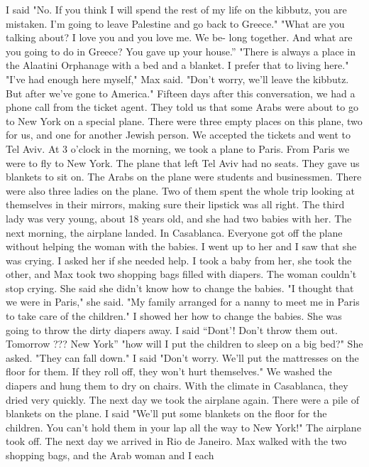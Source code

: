I said "No. If you think I will spend the rest of my life 
on the kibbutz, you are mistaken. I'm going to leave Palestine and go 
back to Greece." 
"What are you talking about? I love you and you love me. We be-
long together. And what are you going to do in Greece? You gave up your house.”
"There is always a place in the Alaatini Orphanage with a bed and 
a blanket. I prefer that to living here." 
"I've had enough here myself," Max said. "Don't worry, we'll leave 
the kibbutz. But after we've gone to America." 
Fifteen days after this conversation, we had a phone call from the 
ticket agent. They told us that some Arabs were about to go to New 
York on a special plane. There were three empty places on this plane, 
two for us, and one for another Jewish person. We accepted the tickets 
and went to Tel Aviv. At 3 o'clock in the morning, we took a plane to 
Paris. From Paris we were to fly to New York. The plane that left Tel 
Aviv had no seats. They gave us blankets to sit on. The Arabs on the 
plane were students and businessmen. There were also three ladies on the 
plane. Two of them spent the whole trip looking at themselves in their 
mirrors, making sure their lipstick was all right. The third lady was 
very young, about 18 years old, and she had two babies with her. 
The next morning, the airplane landed. In Casablanca. Everyone 
got off the plane without helping the woman with the babies. I went 
up to her and I saw that she was crying. I asked her if she needed help. 
I took a baby from her, she took the other, and Max took two shopping 
bags filled with diapers. The woman couldn't stop crying. She said 
she didn't know how to change the babies. 
"I thought that we were in Paris," she said. "My family arranged 
for a nanny to meet me in Paris to take care of the children." 
I showed her how to change the babies. She was going to throw the dirty diapers away. I said “Dont’! Don’t throw them out. Tomorrow ??? New York”
"how will I put the children to sleep on a big bed?" She asked. 
"They can fall down." 
I said "Don't worry. We'll put the mattresses on the floor for 
them. If they roll off, they won't hurt themselves." We washed the 
diapers and hung them to dry on chairs. With the climate in Casablanca, they dried very quickly. 
The next day we took the airplane again. There were a pile of blankets on the plane. I said "We'll put some blankets on the floor for 
the children. You can't hold them in your lap all the way to New 
York!" 
The airplane took off. The next day we arrived in Rio de Janeiro. 
Max walked with the two shopping bags, and the Arab woman and I each 
